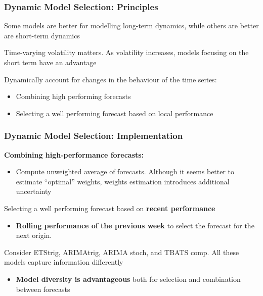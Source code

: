 \documentclass{beamer}
\newenvironment{wideitemize}{\itemize\addtolength{\itemsep}{10pt}}{\enditemize}
\begin{document}
\begin{frame}
  \frametitle{Dynamic Model Selection: Principles}

  \begin{wideitemize}
    \item Some models are better for modelling long-term dynamics, while others are better are short-term dynamics 
    \item Time-varying volatility matters. As volatility increases, models focusing on the short term have an advantage
    \item Dynamically account for changes in the behaviour of the time series:
      \begin{itemize}
      \item Combining high performing forecasts
      \item Selecting a well performing forecast based on local performance
      \end{itemize}
  \end{wideitemize}  
\end{frame}


\begin{frame}
  \frametitle{Dynamic Model Selection: Implementation}

  \begin{wideitemize}
  \item \textbf{Combining high-performance forecasts:}
    \begin{itemize}
    \item Compute unweighted average of forecasts. Although it seems better to estimate “optimal” weights, weights estimation introduces additional uncertainty  
    \end{itemize}
  \item Selecting a well performing forecast based on \textbf{recent performance}
    \begin{itemize}
    \item \textbf{Rolling performance of the previous week} to select the forecast for the next origin. 
    \end{itemize}
    
  \item Consider ETStrig, ARIMAtrig, ARIMA stoch, and TBATS comp. All these models capture information differently
    \begin{itemize}
    \item \textbf{Model diversity is advantageous} both for selection and combination between forecasts
    \end{itemize}
  \end{wideitemize}  
\end{frame}
\end{document}
